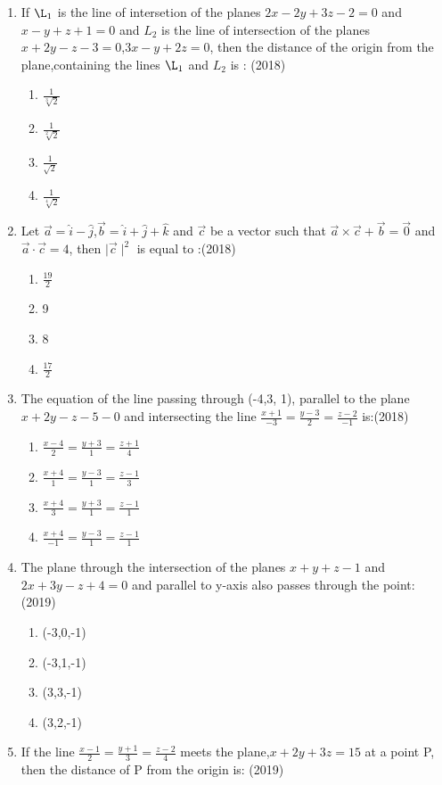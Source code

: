 \documentclass[12pt]{article}
\begin{document}
\begin{enumerate}
\begin{enumerate}
\end{enumerate}
\item If $\L_1$ is the line of intersetion of the planes $2x-2y+3z-2=0$ and $x-y+z+1=0$ and $L_2$ is the line of intersection of the planes $x+2y-z-3=0$,$3x-y+2z=0$, then the distance of the origin from the plane,containing the lines $\L_1$  and $L_2$ is : (2018)
\begin{enumerate}
\item $\frac{1}{\sqrt[3]{2}}$
\item $\frac{1}{\sqrt[2]{2}}$
\item $\frac{1}{\sqrt{2}}$
\item $\frac{1}{\sqrt[4]{2}}$
\end{enumerate}
\item Let $\vec{a}=\hat{i}-\hat{j}$,$\vec{b}=\hat{i}+\hat{j}+\hat{k}$ and $\vec{c}$ be a vector such that $\vec{a}\times\vec{c}+\vec{b}=\vec{0}$ and $\vec{a}\cdot\vec{c}=4$, then $\mid \vec{c}\mid ^2$ is equal to :(2018)
\begin{enumerate}
\item $\frac{19}{2}$
\item 9
\item 8 
\item $\frac{17}{2}$
\end{enumerate}
\item  The equation of the line passing through (-4,3, 1), parallel to the plane $x+2y-z-5-0$ and intersecting the line $\frac{x+1}{-3}=\frac{y-3}{2}=\frac{z-2}{-1}$ is:(2018)
\begin{enumerate}
\item $\frac{x-4}{2}=\frac{y+3}{1}=\frac{z+1}{4}$
\item $\frac{x+4}{1}=\frac{y-3}{1}=\frac{z-1}{3}$
\item $\frac{x+4}{3}=\frac{y+3}{1}=\frac{z-1}{1}$
\item $\frac{x+4}{-1}=\frac{y-3}{1}=\frac{z-1}{1}$
\end{enumerate}
\item  The plane through the intersection of the planes $x+y+z-1$ and $2x+3y-z+4=0$ and parallel to y-axis also  passes through the point: (2019)
\begin{enumerate}
\item (-3,0,-1)
\item (-3,1,-1)
\item (3,3,-1)
\item (3,2,-1)
\end{enumerate}
\item If the line $\frac{x-1}{2}=\frac{y+1}{3}=\frac{z-2}{4}$ meets the plane,$x+2y+3z=15$ at a point P, then the distance of P from the origin is: (2019)

\end{enumerate}
\end{document}
